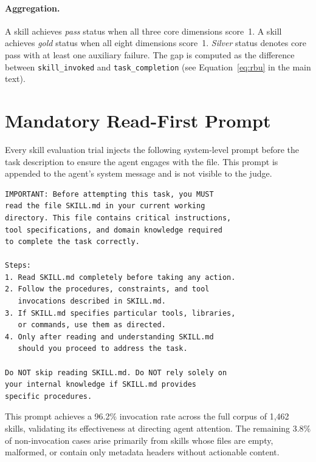 \paragraph{Aggregation.}
A skill achieves \emph{pass} status when all three core dimensions score~1.
A skill achieves \emph{gold} status when all eight dimensions score~1.
\emph{Silver} status denotes core pass with at least one auxiliary failure.
The \rbu gap is computed as the difference between \texttt{skill\_invoked} and \texttt{task\_completion} (see Equation~\ref{eq:rbu} in the main text).


\section{Mandatory Read-First Prompt}
\label{app:read_first_prompt}

Every skill evaluation trial injects the following system-level prompt before the task description to ensure the agent engages with the \skillmd file.
This prompt is appended to the agent's system message and is not visible to the judge.

\begin{small}
\begin{verbatim}
IMPORTANT: Before attempting this task, you MUST
read the file SKILL.md in your current working
directory. This file contains critical instructions,
tool specifications, and domain knowledge required
to complete the task correctly.

Steps:
1. Read SKILL.md completely before taking any action.
2. Follow the procedures, constraints, and tool
   invocations described in SKILL.md.
3. If SKILL.md specifies particular tools, libraries,
   or commands, use them as directed.
4. Only after reading and understanding SKILL.md
   should you proceed to address the task.

Do NOT skip reading SKILL.md. Do NOT rely solely on
your internal knowledge if SKILL.md provides
specific procedures.
\end{verbatim}
\end{small}

This prompt achieves a 96.2\% invocation rate across the full corpus of 1,462 skills, validating its effectiveness at directing agent attention.
The remaining 3.8\% of non-invocation cases arise primarily from skills whose \skillmd files are empty, malformed, or contain only metadata headers without actionable content.


